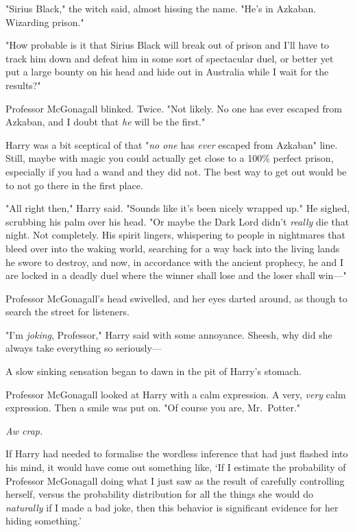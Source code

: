 "Sirius Black," the witch said, almost hissing the name. "He's in Azkaban.
Wizarding prison."

"How probable is it that Sirius Black will break out of prison and I'll have to
track him down and defeat him in some sort of spectacular duel, or better yet
put a large bounty on his head and hide out in Australia while I wait for the
results?"

Professor McGonagall blinked. Twice. "Not likely. No one has ever escaped from
Azkaban, and I doubt that \emph{he} will be the first."

Harry was a bit sceptical of that "\emph{no one} has \emph{ever} escaped from
Azkaban" line. Still, maybe with magic you could actually get close to a 100\%
perfect prison, especially if you had a wand and they did not. The best way to
get out would be to not go there in the first place.

"All right then," Harry said. "Sounds like it's been nicely wrapped up." He
sighed, scrubbing his palm over his head. "Or maybe the Dark Lord didn't
\emph{really} die that night. Not completely. His spirit lingers, whispering to
people in nightmares that bleed over into the waking world, searching for a way
back into the living lands he swore to destroy, and now, in accordance with the
ancient prophecy, he and I are locked in a deadly duel where the winner shall
lose and the loser shall win---"

Professor McGonagall's head swivelled, and her eyes darted around, as though to
search the street for listeners.

"I'm \emph{joking}, Professor," Harry said with some annoyance. Sheesh, why did
she always take everything so seriously---

A slow sinking sensation began to dawn in the pit of Harry's stomach.

Professor McGonagall looked at Harry with a calm expression. A very,
\emph{very} calm expression. Then a smile was put on. "Of course you are,
Mr.~Potter."

\emph{Aw crap.}

If Harry had needed to formalise the wordless inference that had just flashed
into his mind, it would have come out something like, `If I estimate the
probability of Professor McGonagall doing what I just saw as the result of
carefully controlling herself, versus the probability distribution for all the
things she would do \emph{naturally} if I made a bad joke, then this behavior
is significant evidence for her hiding something.'

